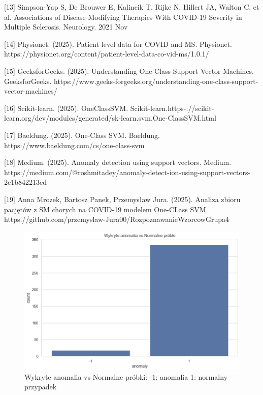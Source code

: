 \documentclass[a4paper,fleqn]{cas-dc}
\begin{document}
[13] Simpson-Yap S, De Brouwer E, Kalincik T, Rijke N, Hillert JA, Walton C, et al. Associations of Disease-Modifying Therapies With COVID-19 Severity in Multiple Sclerosis.  Neurology. 2021 Nov

[14] Physionet. (2025). Patient-level data for COVID and MS. Physionet. https://physionet.org/content/patient-level-data-co-vid-ms/1.0.1/

[15] GeeksforGeeks. (2025). Understanding One-Class Support Vector Machines. GeeksforGeeks. https://www.geeks-forgeeks.org/understanding-one-class-support-vector-machines/

[16] Scikit-learn. (2025). OneClassSVM. Scikit-learn.https-://scikit-learn.org/dev/modules/generated/sk-learn.svm.One-ClassSVM.html

[17] Baeldung. (2025). One-Class SVM. Baeldung. https://www.baeldung.com/cs/one-class-svm

[18] Medium. (2025). Anomaly detection using support vectors. Medium. https://medium.com/@roshmitadey/anomaly-detect-ion-using-support-vectors-2c1b842213ed

[19] Anna Mrozek, Bartosz Panek, Przemysław Jura. (2025). Analiza zbioru pacjętów z SM chorych na COVID-19 modelem One-CLass SVM. https://github.com/przemyslaw-Jura00/RozpoznawanieWzorcowGrupa4


\newpage
\begin{figure}[ht]
	\includegraphics[scale=.50]{wykresy/wykres1.png}
	\caption{Wykryte anomalia vs Normalne próbki: -1: anomalia 1: normalny przypadek}
	\label{FIG:1}
\end{figure}
\end{document}

